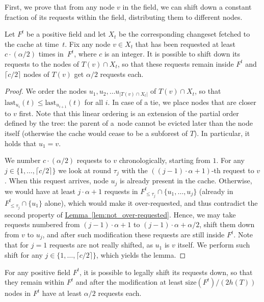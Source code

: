 \documentclass[sigconf,screen=true]{acmart}
\newcommand{\lref}[2][]{\hyperref[#2]{#1~\ref*{#2}}}
\newcommand{\last}{\textrm{last}}
\newcommand{\size}{\textrm{size}}
\begin{document}
First, we prove that from any node $v$ in the field, we can shift down a
constant fraction of its requests within the field, distributing them to
different nodes.

\begin{lemma}
\label{lem:downshift}
Let $F^t$ be a positive field and let $X_t$ be the corresponding changeset
fetched to the cache at time~$t$. Fix any node $v \in X_t$ that has been
requested at least $c \cdot (\alpha / 2)$ times in~$F^t$, where $c$ is an
integer. It is possible to shift down its requests to the nodes of $T(v) \cap
X_t$, so that these requests remain inside $F^t$ and $\lceil c / 2 \rceil$
nodes of $T(v)$ get $\alpha / 2$ requests each.
\end{lemma}

\begin{proof}
We order the nodes $u_1, u_2, \ldots u_{|T(v) \cap X_t|}$ of $T(v) \cap X_t$,
so that $\last_{u_i}(t) \leq \last_{u_{i+1}}(t)$ for all $i$. In case of a
tie, we place nodes that are closer to $v$ first. Note that this linear
ordering is an extension of the partial order defined by the tree: the parent
of a~node cannot be evicted later than the node itself (otherwise the cache
would cease to be a subforest of $T$). In particular, it holds that $u_1 = v$.

We number $c \cdot (\alpha / 2)$ requests to $v$ chronologically, starting
from $1$. For any $j \in \{1, \ldots, \lceil c/2 \rceil \}$ we look at round
$\tau_j$ with the $((j-1) \cdot \alpha + 1)$-th request to $v$. When this
request arrives, node $u_j$ is already present in the cache. Otherwise, we
would have at least \mbox{$j \cdot \alpha + 1$} requests in $F^t_{\leq
{\tau_j}} \cap \{u_1, \ldots, u_j\}$ (already in $F^t_{\leq {\tau_j}}
\cap \{u_1\}$ alone), which would make it over-requested, and thus contradict
the second property of \lref[Lemma]{lem:not_over-requested}. Hence, we may
take requests numbered from $(j-1) \cdot \alpha + 1$ to $(j-1) \cdot \alpha +
\alpha/2$, shift them down from $v$ to $u_j$, and after such modification
these requests are still inside $F^t$. Note that for $j = 1$ requests are not
really shifted, as $u_1$ is $v$ itself. We perform such shift for any $j \in
\{1, \ldots, \lceil c/2 \rceil \}$, which yields the lemma.
\end{proof}
  
\begin{lemma}
\label{lem:crucial_lemma_pos}
For any positive field $F^t$, it is possible to legally shift its requests
down, so that they remain within $F^t$ and after the modification at least
$\size(F^t)/(2 h(T))$ nodes in $F^t$ have at least $\alpha/2$ requests each.
\end{lemma}
\end{document}
